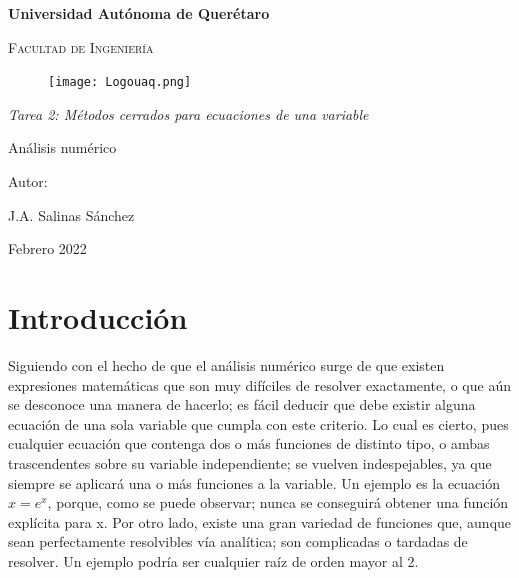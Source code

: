 \documentclass[12pt,oneside,FLEQN]{report}
\begin{document}
{
\selectfont
\begin{titlepage}
        \topmargin=0cm
        \centering

        {\bfseries\LARGE Universidad Autónoma de Querétaro \par}
        \vspace{1cm}
        {\scshape\Large  Facultad de Ingenier\'ia  \par}
        \vspace{2cm}
        \centering
        \begin{figure}[!h]
        \centering
                \texttt{[image: Logouaq.png]}
        \end{figure}
        \vspace{3cm}
        {\itshape\large Tarea 2: Métodos cerrados para ecuaciones de una variable\par}
        \vspace{3cm}
        {\Huge Análisis numérico \par}
        \vspace{2cm}
        {\Large Autor: \par}
        {\large J.A. Salinas Sánchez \par}
        {\large Febrero 2022 \par}
\end{titlepage}
\tableofcontents
\chapter{Introducción}
	Siguiendo con el hecho de que el análisis numérico surge de que existen expresiones matemáticas que son muy difíciles de resolver exactamente, o que aún se desconoce una manera de hacerlo; es fácil deducir que debe existir alguna ecuación de una sola variable que cumpla con este criterio. Lo cual es cierto, pues cualquier ecuación que contenga dos o más funciones de distinto tipo, o ambas trascendentes sobre su variable independiente; se vuelven indespejables, ya que siempre se aplicará una o más funciones a la variable. Un ejemplo es la ecuación $x=e^x$, porque, como se puede observar; nunca se conseguirá obtener una función explícita para x. Por otro lado, existe una gran variedad de funciones que, aunque sean perfectamente resolvibles vía analítica; son complicadas o tardadas de resolver. Un ejemplo podría ser cualquier raíz de orden mayor al 2.\\

}
\end{document}
